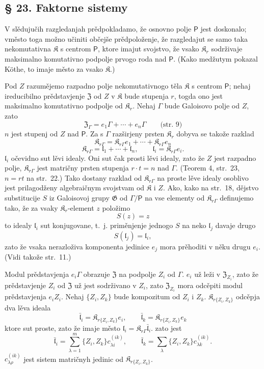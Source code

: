 \documentclass[11pt]{article}
\newcommand{\foreign}[1]{#1}
\begin{document}
\subsection*{§ 23. Faktorne sistemy}\label{faktorensysteme}

V slědujučih razgledanjah prědpokladamo, že osnovno polje \(\mathsf P\) jest doskonalo; vměsto toga možno učiniti občejše prědpoloženje, že razgledajut se samo taka nekomutativna \(\mathfrak K\) s centrom \(\mathsf P\), ktore imajut svojstvo, že vsako \(\mathfrak K_r\) sodrživaje maksimalno komutativno podpolje prvogo roda nad \(\mathsf P\). (Kako medžutym pokazal \foreign{Köthe}, to imaje město za vsako \(\mathfrak K\).)

Pod \(Z\) razumějemo razpadno polje nekomutativnogo těla \(\mathfrak K\) s centrom \(\mathsf P\); nehaj ireducibilno prědstavjenje \(\mathfrak Z\) od \(Z\) v \(\mathfrak K\) bude stupenja \(r\), togda ono jest maksimalno komutativno podpolje od \(\mathfrak K_r\). Nehaj \(\Gamma\) bude Galoisovo polje od \(Z\), zato
\[
\mathfrak Z_\Gamma=e_1\Gamma+\cdots+e_n\Gamma
\qquad\text{(str.~9)}
\]
\(n\) jest stupenj od \(Z\) nad \(\mathsf P\). Za s \(\Gamma\) razširjeny prsten \(\mathfrak K_r\) dobyva se takože razklad
\[
\mathfrak K_{r\Gamma}=\mathfrak K_{r\Gamma}e_1+\cdots+\mathfrak K_{r\Gamma}e_n
\]
\[
\mathfrak K_{r\Gamma}=\mathfrak l_1+\cdots+\mathfrak l_n,\qquad
\mathfrak l_i=\mathfrak K_{r\Gamma}e_i.
\]
\(\mathfrak l_i\) očevidno sut lěvi idealy. Oni sut čak prosti lěvi idealy, zato že \(Z\) jest razpadno polje, \(\mathfrak K_{r\Gamma}\) jest matričny prsten stupenja \(r\cdot t=n\) nad \(\Gamma\). (Teorem 4, str.~23, \(n=rt\) na str.~22.) Tako dostany razklad od \(\mathfrak K_{r\Gamma}\) na proste lěve idealy osoblivo jest prilagodženy algebraičnym svojstvam od \(\mathfrak K\) i \(Z\). Ako, kako na str.~18, dějstvo substitucije \(S\) iz Galoisovoj grupy \(\mathfrak G\) od \(\Gamma/\mathsf P\) na vse elementy od \(\mathfrak K_{r\Gamma}\) definujemo tako, že za vsaky \(\mathfrak K_r\)-element \(z\) položimo
\[
S(z)=z
\]
to idealy \(\mathfrak l_i\) sut konjugovane, t.~j. priměnjenje jednogo \(S\) na neko \(\mathfrak l_j\) davaje drugo
\[
S(\mathfrak l_j)=\mathfrak l_i,
\]
zato že vsaka nerazloživa komponenta jedinice \(e_j\) mora prěhoditi v něku drugu \(e_i\). (Vidi takože str.~11.)

Modul prědstavjenja \(e_i\Gamma\) obrazuje \(\mathfrak Z\) na podpolje \(Z_i\) od \(\Gamma\). \(e_i\) už leži v \(\mathfrak Z_{Z_i}\), zato že prědstavjenje \(Z_i\) od \(\mathfrak Z\) už jest sodrživano v \(Z_i\), zato \(\mathfrak Z_{Z_i}\) mora odcěpiti modul prědstavjenja \(e_iZ_i\). Nehaj \(\{Z_i,Z_k\}\) bude kompozitum od \(Z_i\) i \(Z_k\). \(\mathfrak K_{r\{Z_i,Z_k\}}\) odcěpja dva lěva ideala
\[
\bar{\mathfrak l}_i=\mathfrak K_{r\{Z_i,Z_k\}}e_i,\qquad
\bar{\mathfrak l}_k=\mathfrak K_{r\{Z_i,Z_k\}}e_k
\]
ktore sut proste, zato že imaje město \(\mathfrak l_i=\mathfrak K_{r\Gamma}\bar{\mathfrak l}_i\). zato jest
\[
\bar{\mathfrak l}_i=\sum_{\lambda=1}^m\{Z_i,Z_k\}c_{\lambda i}^{(ik)},\qquad
\bar{\mathfrak l}_k=\sum_{\lambda}\{Z_i,Z_k\}c_{\lambda k}^{(ik)}.
\]
\(c_{\lambda\rho}^{(ik)}\) jest sistem matričnyh jedinic od \(\mathfrak K_{r\{Z_i,Z_k\}}\).
\end{document}
